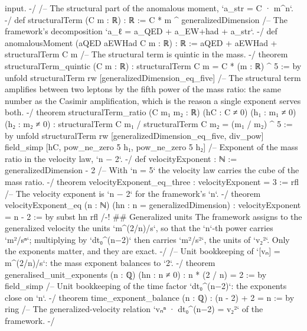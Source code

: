 \documentclass[11pt,a4paper]{article}
\begin{document}
{input. -/
\mbox{}
/-- The structural part of the anomalous moment, `a\_\allowbreak{}str = C · m\textasciicircum{}n`. -/
def structuralTerm (C m : ℝ) : ℝ := C * m \textasciicircum{} generalizedDimension
\mbox{}
/-- The framework's decomposition `a\_\allowbreak{}ℓ = a\_\allowbreak{}QED + a\_\allowbreak{}EW+had + a\_\allowbreak{}str`. -/
def anomalousMoment (aQED aEWHad C m : ℝ) : ℝ := aQED + aEWHad + structuralTerm C m
\mbox{}
/-- The structural term is quintic in the mass. -/
theorem structuralTerm\_\allowbreak{}quintic (C m : ℝ) : structuralTerm C m = C * (m : ℝ) \textasciicircum{} 5 := by
  unfold structuralTerm
  rw [generalizedDimension\_\allowbreak{}eq\_\allowbreak{}five]
\mbox{}
/-- The structural term amplifies between two leptons by the fifth power of the
mass ratio: the same number as the Casimir amplification, which is the reason a
single exponent serves both. -/
theorem structuralTerm\_\allowbreak{}ratio (C m₁ m₂ : ℝ) (hC : C ≠ 0) (h₁ : m₁ ≠ 0) (h₂ : m₂ ≠ 0) :
    structuralTerm C m₁ / structuralTerm C m₂ = (m₁ / m₂) \textasciicircum{} 5 := by
  unfold structuralTerm
  rw [generalizedDimension\_\allowbreak{}eq\_\allowbreak{}five, div\_\allowbreak{}pow]
  field\_\allowbreak{}simp [hC, pow\_\allowbreak{}ne\_\allowbreak{}zero 5 h₁, pow\_\allowbreak{}ne\_\allowbreak{}zero 5 h₂]
\mbox{}
/-- Exponent of the mass ratio in the velocity law, `n − 2`. -/
def velocityExponent : ℕ := generalizedDimension - 2
\mbox{}
/-- With `n = 5` the velocity law carries the cube of the mass ratio. -/
theorem velocityExponent\_\allowbreak{}eq\_\allowbreak{}three : velocityExponent = 3 := rfl
\mbox{}
/-- The velocity exponent is `n − 2` for the framework's `n`. -/
theorem velocityExponent\_\allowbreak{}eq (n : ℕ) (hn : n = generalizedDimension) :
    velocityExponent = n - 2 := by
  subst hn
  rfl
\mbox{}
/-! \#\# Generalized units
\mbox{}
The framework assigns to the generalized velocity the units `m\textasciicircum{}(2/n)/s`, so that
the `n`-th power carries `m²/sⁿ`; multiplying by `dt₀\textasciicircum{}(n−2)` then carries
`m²/s²`, the units of `v₂²`.  Only the exponents matter, and they are exact.
-/
\mbox{}
/-- Unit bookkeeping of `[vₙ] = m\textasciicircum{}(2/n)/s`: the mass exponent balances to `2`. -/
theorem generalised\_\allowbreak{}unit\_\allowbreak{}exponents (n : ℚ) (hn : n ≠ 0) : n * (2 / n) = 2 := by
  field\_\allowbreak{}simp
\mbox{}
/-- Unit bookkeeping of the time factor `dt₀\textasciicircum{}(n−2)`: the exponents close on `n`. -/
theorem time\_\allowbreak{}exponent\_\allowbreak{}balance (n : ℚ) : (n - 2) + 2 = n := by
  ring
\mbox{}
/-- The generalized-velocity relation `vₙⁿ · dt₀\textasciicircum{}(n−2) = v₂²` of the framework. -/
}
\end{document}
